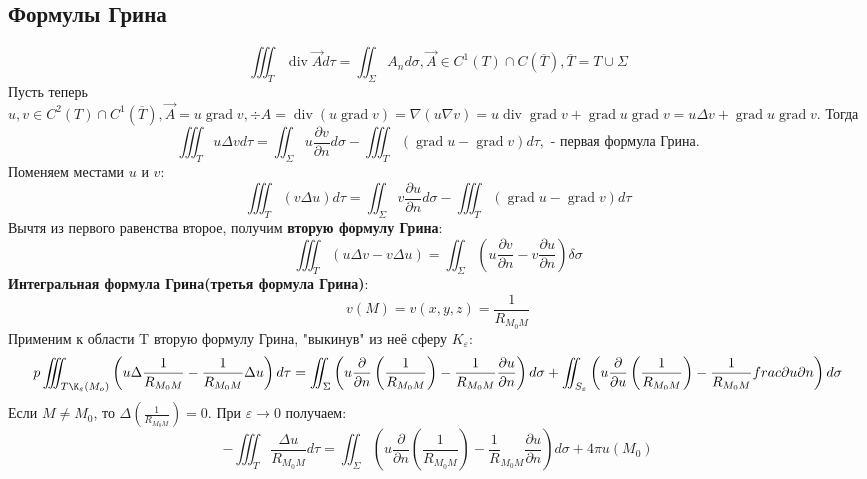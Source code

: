 \documentclass[11pt]{article}
\begin{document}
\subsection{Формулы Грина}
\label{sec:org88965e2}
\begin{equation}
\iiint_T\operatorname{div}\vec Ad\tau = \iint_{\Sigma}A_nd\sigma,
\vec A \in C^1(T) \cap C(\overline T), \overline T = T \cup \Sigma
\end{equation}
Пусть теперь $u, v \in C^2(T) \cap C^1(\overline T), \vec A = u\operatorname{grad}v, \div A = \operatorname{div}(u\operatorname{grad}v)
= \nabla(u\nabla v) = u\operatorname{div}\operatorname{grad}v + \operatorname{grad}u\operatorname{grad}v = u\Delta v + \operatorname{grad}u\operatorname{grad}v$. Тогда
\begin{equation}
\iiint_Tu\Delta vd\tau = \iint_{\Sigma}u\frac{\partial v}{\partial n}d\sigma -
\iiint_T(\operatorname{grad}u - \operatorname{grad}v)d\tau, \text{ - первая формула Грина.}
\end{equation}
Поменяем местами $u$ и $v$:
\begin{equation}
\iiint_T(v\Delta u)d\tau = \iint_{\Sigma}v\frac{\partial u}{\partial n}d\sigma -
\iiint_T(\operatorname{grad}u - \operatorname{grad}v)d\tau
\end{equation}
Вычтя из первого равенства второе, получим \textbf{вторую формулу Грина}:
\begin{equation}
\iiint_T(u\Delta v - v\Delta u) = \iint_{\Sigma}\left(u\frac{\partial v}{\partial n} -
v\frac{\partial u}{\partial n}\right)\delta\sigma
\end{equation}
\textbf{Интегральная формула Грина(третья формула Грина)}:
\begin{equation}
v(M) = v(x, y, z) = \frac1{R_{M_0M}}
\end{equation}
Применим к области T вторую формулу Грина, "выкинув" из неё сферу $K_{\varepsilon}$:
\begin{equation}
p\iiint_{T\K_{\varepsilon}(M_o)}\left(u\Delta\frac1{R_{M_0M}}-\frac1{R_{M_0M}}\Delta u\right)d\tau =
\iint_{\Sigma}\left(u\frac{\partial}{\partial n}\left(\frac1{R_{M_0M}}\right) - \frac1{R_{M_0M}}\frac{\partial u}{\partial n}\right)d\sigma +
\iint_{S_{\varepsilon}}\left(u\frac{\partial}{\partial u}\left(\frac1{R_{M_0M}}\right) - \frac1{R_{M_0M}}frac{\partial u}{\partial n}\right)d\sigma
\end{equation}
Если $M \neq M_0$, то $\Delta\left(\frac1{R_{M_0M}}\right) = 0$. При $\varepsilon \to 0$ получаем:
\begin{equation}
-\iiint_T\frac{\Delta u}{R_{M_0M}}d\tau = \iint_{\Sigma}\left(u\frac{\partial}{\partial n}\left(\frac1{R_{M_0M}}\right) - \frac1R_{M_0M}\frac{\partial u}{\partial n}\right)d\sigma
+ 4\pi u(M_0)
\end{equation}
\end{document}

